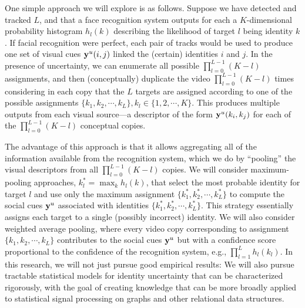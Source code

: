 
One simple approach we will explore is as follows. Suppose we have detected and tracked $L$, and that a face recognition system outputs for each a $K$-dimensional probability histogram $h_l(k)$ describing the likelihood of target $l$ being identity $k$. If facial recognition were perfect, each pair of tracks would be used to produce one set of visual cues ${\bf y}^u(i,j)$ linked the (certain) identities $i$ and $j$. In the presence of uncertainty, we can enumerate all possible $\prod_{l=0}^{L-1}(K-l)$ assignments, and then (conceptually) duplicate the video $\prod_{l=0}^{L-1}(K-l)$ times considering in each copy that the $L$ targets are assigned according to one of the possible assignments $\{k_1, k_2, \cdots, k_L\}, k_l\in\{1,2, \cdots, K\}$. This produces multiple outputs from each visual source---a descriptor of the form ${\bf y}^u(k_i,k_j)$ for each of the $\prod_{l=0}^{L-1}(K-l)$ conceptual copies.

The advantage of this approach is that it allows aggregating all of the information available from the recognition system, which we do by ``pooling'' the visual descriptors from all $\prod_{l=0}^{L-1}(K-l)$ copies. We will consider maximum-pooling approaches, $k_l^{*}=\max_{k}h_l(k)$, that select the most probable identity for target $l$ and use only the maximum assignment $\{k_1^{*}, k_2^{*}, \cdots, k_L^{*}\}$ to compute the social cues ${\bf y}^u$ associated with identities $\{k_1^{*}, k_2^{*}, \cdots, k_L^{*}\}$. This strategy essentially assigns each target to a single (possibly incorrect) identity. We will also consider weighted average pooling, where every video copy corresponding to assignment $\{k_1, k_2, \cdots, k_L\}$ contributes to the social cues ${\bf y}^u$ but with a confidence score proportional to the confidence of the recognition system, e.g., $\prod_{l=1}^{L}h_l(k_l)$. In this research, we will not just pursue good empirical results: We will also pursue tractable statistical models for identity uncertainty that can be characterized rigorously, with the goal of creating knowledge that can be more broadly applied to statistical signal processing on graphs and other relational data structures.
